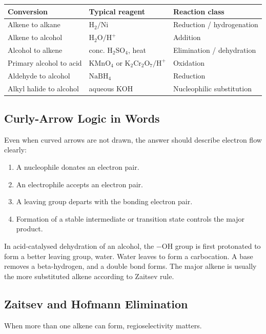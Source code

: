 \documentclass[12pt,a4paper]{article}
\begin{document}
\begin{tabularx}{\linewidth}{|B{3.2cm}|Y|Y|}
\hline
\textbf{Conversion} & \textbf{Typical reagent} & \textbf{Reaction class} \\
\hline
Alkene to alkane & $\mathrm{H_2/Ni}$ & Reduction / hydrogenation \\
\hline
Alkene to alcohol & $\mathrm{H_2O/H^+}$ & Addition \\
\hline
Alcohol to alkene & conc. $\mathrm{H_2SO_4}$, heat & Elimination / dehydration \\
\hline
Primary alcohol to acid & $\mathrm{KMnO_4}$ or $\mathrm{K_2Cr_2O_7/H^+}$ & Oxidation \\
\hline
Aldehyde to alcohol & $\mathrm{NaBH_4}$ & Reduction \\
\hline
Alkyl halide to alcohol & aqueous $\mathrm{KOH}$ & Nucleophilic substitution \\
\hline
\end{tabularx}

\subsection{Curly-Arrow Logic in Words}
Even when curved arrows are not drawn, the answer should describe electron flow clearly:
\begin{enumerate}[leftmargin=*, itemsep=3pt, topsep=2pt]
  \item A nucleophile donates an electron pair.
  \item An electrophile accepts an electron pair.
  \item A leaving group departs with the bonding electron pair.
  \item Formation of a stable intermediate or transition state controls the major product.
\end{enumerate}

\begin{tcolorbox}[examplebox, title={Worked Mechanism in Words: Alcohol to Alkene}]
In acid-catalysed dehydration of an alcohol, the $-\mathrm{OH}$ group is first protonated to form a better leaving group, water. Water leaves to form a carbocation. A base removes a beta-hydrogen, and a double bond forms. The major alkene is usually the more substituted alkene according to Zaitsev rule.
\end{tcolorbox}

\subsection{Zaitsev and Hofmann Elimination}
When more than one alkene can form, regioselectivity matters.
\end{document}
